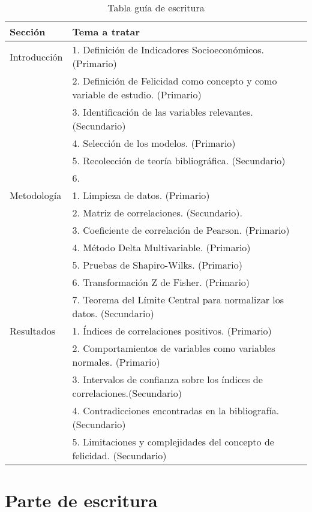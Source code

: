 \begin{table}[H]
    \caption{Tabla guía de escritura}
    \begin{center}
        \begin{tabular}{  m{2cm}  m{8cm}  }
        \hline
        Sección & Tema a tratar \\
        \hline
        Introducción & 1. Definición de Indicadores Socioeconómicos. (Primario) \\
        & 2. Definición de Felicidad como concepto y como variable de estudio. (Primario) \\
        & 3. Identificación de las variables relevantes. (Secundario)\\ 
        & 4. Selección de los modelos. (Primario)\\ 
        & 5. Recolección de teoría bibliográfica. (Secundario)\\ 
        & 6. \\
        \hline
        Metodología & 1. Limpieza de datos. (Primario) \\
        & 2. Matriz de correlaciones. (Secundario). \\
        & 3. Coeficiente de correlación de Pearson. (Primario) \\
        & 4. Método Delta Multivariable. (Primario) \\
        & 5. Pruebas de Shapiro-Wilks. (Primario) \\
        & 6. Transformación Z de Fisher. (Primario) \\
        & 7. Teorema del Límite Central para normalizar los datos. (Secundario)\\
        \hline
        Resultados & 1. Índices de correlaciones positivos. (Primario)\\
        & 2. Comportamientos de variables como variables normales. (Primario)\\
        & 3. Intervalos de confianza sobre los índices de correlaciones.(Secundario)\\ 
        & 4. Contradicciones encontradas en la bibliografía. (Secundario)\\
        & 5. Limitaciones y complejidades del concepto de felicidad. (Secundario)\\
        \hline
        \end{tabular}
    \end{center}
\end{table}

\newpage

\section{Parte de escritura}

